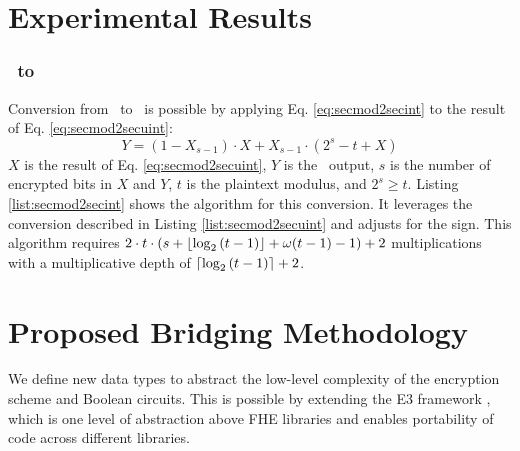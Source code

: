 



\section{Experimental Results}\label{s:results}





% 
% 


\subsubsection{\secmod\ to \secint{}}\label{sss:secmod2secint}

Conversion from \secmod\ to \secint\ is possible by applying Eq. \ref{eq:secmod2secint} to the result of Eq. \ref{eq:secmod2secuint}:
\begin{equation}\label{eq:secmod2secint}
    Y = (1 - X_{s-1}) \cdot X + X_{s-1} \cdot (2^s - t + X)
\end{equation}
$X$ is the result of Eq. \ref{eq:secmod2secuint}, $Y$ is the \secint\ output, $s$ is the number of encrypted bits in $X$ and $Y$, $t$ is the plaintext modulus, and $2^s \geq t$.
Listing \ref{list:secmod2secint} shows the algorithm for this conversion. It leverages the conversion described in Listing \ref{list:secmod2secuint} and adjusts for the sign.
This algorithm requires $2 \cdot t \cdot (s + \lfloor\log_2{(t-1)}\rfloor + \omega(t-1) - 1)+2$ multiplications with a multiplicative depth of $\lceil\log_2{(t-1)}\rceil + 2$.


\section{Proposed Bridging Methodology}\label{s:bridging}

We define new data types to abstract the low-level complexity of the encryption scheme and Boolean circuits.
This is possible by extending the  E3 framework \cite{e3eprint}, which is one level of abstraction above FHE libraries and enables portability of code across different libraries.


% 


